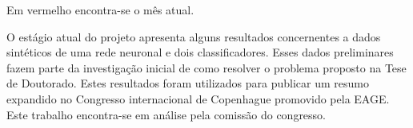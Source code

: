 Em  {\color{red}vermelho} encontra-se o mês atual.
\begin{table}[H]
	\centering
	
	\begin{small}
		
		\setlength{\tabcolsep}{2pt}
		
	\end{small}
	\caption{Cronograma das atividades previstas para o primeiro biênio.}
	\label{t1_cronograma}
\end{table}

O estágio atual do projeto apresenta alguns resultados concernentes a dados sintéticos de uma rede neuronal e dois classificadores. Esses dados preliminares fazem parte da investigação inicial de como resolver o problema proposto na Tese de Doutorado. Estes resultados foram utilizados para publicar um resumo expandido no Congresso internacional de Copenhague promovido pela EAGE. Este trabalho encontra-se em análise pela comissão do congresso. 

